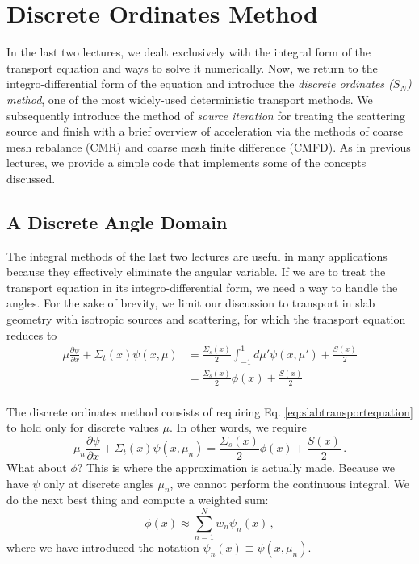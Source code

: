 
\chapter{Discrete Ordinates Method}
\label{lec:discreteordinates}

In the last two lectures, we dealt exclusively with the integral form of the transport equation and ways to solve it numerically.  Now, we return to the integro-differential form of the equation and introduce the \textit{discrete ordinates ($S_N$) method}, one of the most widely-used deterministic transport methods.  We subsequently introduce the method of \textit{source iteration} for treating the scattering source and finish with a brief overview of acceleration via the methods of coarse mesh rebalance (CMR) and coarse mesh finite difference (CMFD).  As in previous lectures, we provide a simple code that implements some of the concepts discussed.

\section*{A Discrete Angle Domain}

The integral methods of the last two lectures are useful in many applications because they effectively eliminate the angular variable.  If we are to treat the transport equation in its integro-differential form, we need a way to handle the angles.  For the sake of brevity, we limit our discussion to transport in slab geometry with isotropic sources and scattering, for which the transport equation reduces to
\begin{equation}
\begin{split}
 \mu \frac{\partial \psi}{\partial x} + \Sigma_t(x)\psi(x,\mu) &= \frac{\Sigma_s(x)}{2}\int^1_{-1}d\mu' \psi(x,\mu') + \frac{S(x)}{2} \\
                                                               &= \frac{\Sigma_s(x)}{2}\phi(x) + \frac{S(x)}{2} \\
\end{split}
 \label{eq:slabtransportequation}
\end{equation}

The discrete ordinates method consists of requiring Eq. \ref{eq:slabtransportequation} to hold only for discrete values $\mu$.  In other words, we require
\begin{equation}
 \mu_n \frac{\partial \psi}{\partial x} + \Sigma_t(x)\psi(x,\mu_n) = \frac{\Sigma_s(x)}{2} \phi(x) + \frac{S(x)}{2} \, .
 \label{eq:snequation}
\end{equation}
What about $\phi$?  This is where the approximation is actually made.  Because we have $\psi$ only at discrete angles $\mu_n$, we cannot perform the continuous integral.  We do the next best thing and compute a weighted sum:
\begin{equation}
 \phi(x) \approx \sum^N_{n=1} w_n  \psi_n(x) \, ,
 \label{eq:phiquad}
\end{equation}
where we have introduced the notation $\psi_n(x) \equiv \psi(x,\mu_n)$.  

